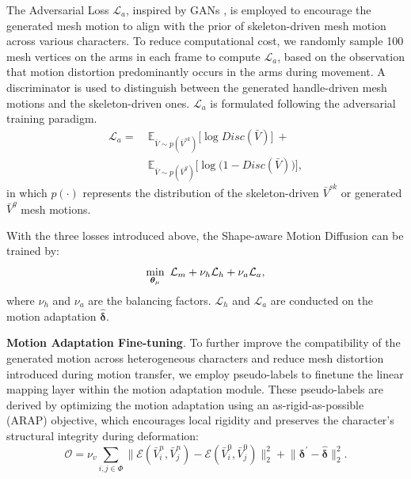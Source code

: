 \documentclass[lettersize,journal]{IEEEtran}
\begin{document}
The Adversarial Loss $\mathcal{L}_a$, inspired by GANs \cite{goodfellow2020generative}, is employed to encourage the generated mesh motion to align with the prior of skeleton-driven mesh motion across various characters. To reduce computational cost, we randomly sample 100 mesh vertices on the arms in each frame to compute $\mathcal{L}_a$, based on the observation that motion distortion predominantly occurs in the arms during movement. A discriminator is used to distinguish between the generated handle-driven mesh motions and the skeleton-driven ones. $\mathcal{L}_a$ is formulated following the adversarial training paradigm.
\begin{equation} \label{Eq.11}
\begin{aligned}
\mathcal{L}_{a} = &~\mathbb{E}_{\bar{V}\sim p(\bar{V}^{sk})}\big[\log Disc(\bar{V})\big]~+ \\
&~\mathbb{E}_{\bar{V} \sim p(\bar{V}^{g})}\big[\log\big(1-Disc(\bar{V})\big)\big],
\end{aligned}
\end{equation}
in which $p(\cdot)$ represents the distribution of the skeleton-driven $\bar{V}^{sk}$ or generated $\bar{V}^{g}$ mesh motions.

With the three losses introduced above, the Shape-aware Motion Diffusion can be trained by:
\begin{equation} \label{Eq.12}
\setlength{\belowdisplayskip}{-1pt}
\min_{\bm{\theta}_\mu}~\mathcal{L}_{m}+ \nu_{h}\mathcal{L}_{h} + \nu_{a}\mathcal{L}_{a},
\end{equation}
where $\nu_{h}$ and $\nu_{a}$ are the balancing factors. $\mathcal{L}_{h}$ and $\mathcal{L}_{a}$ are conducted on the motion adaptation $\hat{\bm{\delta}}$.

\textbf{Motion Adaptation Fine-tuning}. To further improve the compatibility of the generated motion across heterogeneous characters and reduce mesh distortion introduced during motion transfer, we employ pseudo-labels to finetune the linear mapping layer within the motion adaptation module. These pseudo-labels are derived by optimizing the motion adaptation using an as-rigid-as-possible (ARAP) objective, which encourages local rigidity and preserves the character's structural integrity during deformation:
\begin{equation} \label{Eq.13}
\mathcal{O} = \nu_{v}\sum_{i,j \in \Phi} \lVert \mathcal{E}(\bar{V}^{n}_{i}, \bar{V}^{n}_{j}) - \mathcal{E}(\bar{V}^{0}_{i}, \bar{V}^{0}_{j}) \rVert^{2}_{2} + \lVert \bm{\delta}^{'} - \hat{\bm{\delta}} \rVert^{2}_{2}.
\end{equation}
\end{document}
